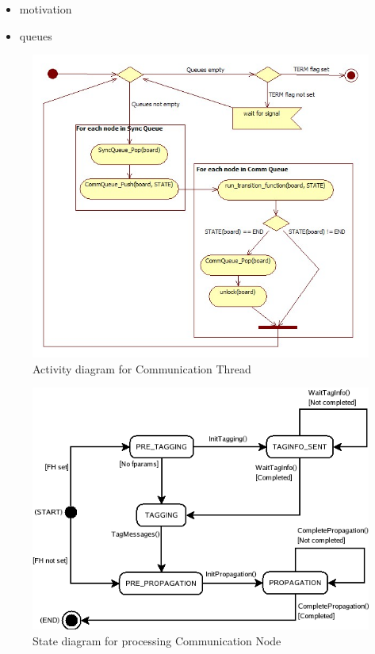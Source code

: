 \begin{itemize}
\item motivation
\item queues
\end{itemize} 



\begin{figure}[h]
 \centering
  \includegraphics[scale=0.50]{commloop.jpg}
 \caption{Activity diagram for Communication Thread}
 \label{fig:commloop}
\end{figure}

\begin{figure}[h]
 \centering
  \includegraphics[scale=0.50]{CommNode.png}
 \caption{State diagram for processing Communication Node}
 \label{fig:commstate}
\end{figure}

